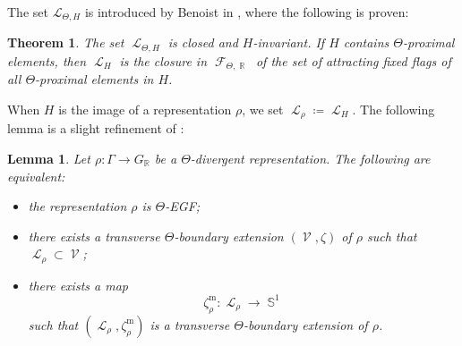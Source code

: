 \documentclass{amsart}
\theoremstyle{plain}
\newtheorem{theorem}[proposition]{Theorem}
\newtheorem{lemma}[proposition]{Lemma}
\theoremstyle{definition}
\DeclareMathOperator{\Fc}{\mathcal{F}}
\DeclareMathOperator{\Lc}{\mathcal{L}}
\DeclareMathOperator{\Vc}{\mathcal{V}}
\DeclareMathOperator{\Rb}{{\mathbb{R}}}
\DeclareMathOperator{\Sb}{\mathbb{S}}
\newcommand{\1}{\mathbf{1}}
\begin{document}
The set $\mathcal L_{\Theta,H}$ is introduced by Benoist in \cite{benoist1997proprietes}, where the following is proven:

\begin{theorem}
\label{remark: Benoist limit cone}
The set $\Lc_{\Theta,H}$ is closed and $H$-invariant. If $H$ contains $\Theta$-proximal elements, then  $\Lc_H$ is the closure in $\Fc_{\Theta,\Rb}$ of the set of attracting fixed flags of all $\Theta$-proximal elements in $H$. 
\end{theorem}

When $H$ is the image of a representation $\rho$, we set $\Lc_\rho\coloneqq\Lc_H$. The following lemma is a slight refinement of \cite[Theorem~1.3]{W23b}:

\begin{lemma}
\label{lemma: equivalences EGF and divergent}
    Let $\rho\colon \Gamma \to G_{\Rb}$ be a $\Theta$-divergent representation. The following are equivalent:
    \begin{itemize}
        \item[(i)] the representation $\rho$ is $\Theta$-EGF;
        \item[(ii)] there exists a transverse $\Theta$-boundary extension $(\Vc,\zeta)$ of $\rho$ such that $\Lc_\rho\subset \Vc$;
        \item[(iii)] there exists a map \[\zeta^{\mathrm{m}}_\rho\colon \Lc_\rho \to \Sb^1\]
        such that $(\Lc_\rho, \zeta_\rho^{\mathrm{m}})$ is a transverse $\Theta$-boundary extension of $\rho$.
    \end{itemize}
\end{lemma}
\end{document}
